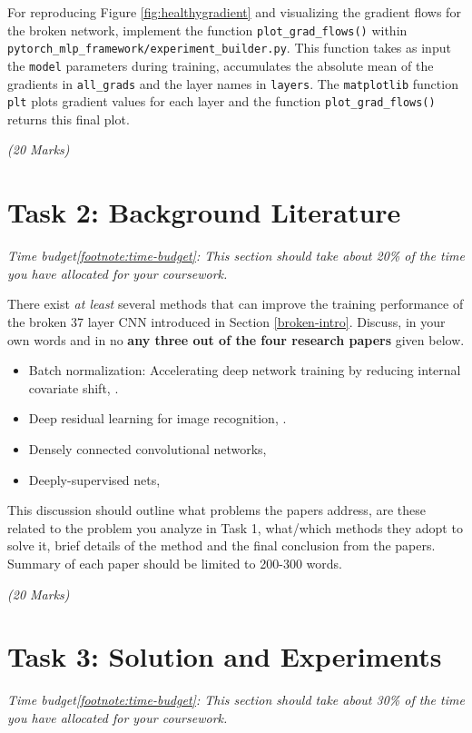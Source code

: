 \documentclass[11pt,]{article}
\begin{document}
For reproducing Figure \ref{fig:healthygradient} and visualizing the gradient flows for the broken network, implement the function \texttt{plot\_grad\_flows()} within \texttt{pytorch\_mlp\_framework/experiment\_builder.py}. This function takes as input the \texttt{model} parameters during training, accumulates the absolute mean of the gradients in \texttt{all\_grads} and the layer names in \texttt{layers}. The \texttt{matplotlib} function \texttt{plt} plots gradient values for each layer and the function \texttt{plot\_grad\_flows()} returns this final plot.

\emph{(20 Marks)}



\section{Task 2: Background Literature}
\label{sec.related}
\textit{Time budget{\cref{footnote:time-budget}}: This section should take about 20\% of the time you have allocated for your coursework.}\newline

There exist \emph{at least} several methods that can improve the training performance of the broken 37 layer CNN introduced in Section \ref{broken-intro}. Discuss, in your own words and in no \textbf{{any three out of the four research papers}} given below. 

\begin{itemize} 
    \item Batch normalization: Accelerating deep network training by reducing internal covariate shift, \cite{ioffe2015batch}.
    \item Deep residual learning for image recognition, \cite{he2016deep}.
    \item Densely connected convolutional networks, \cite{huang2017densely}
    \item Deeply-supervised nets, \cite{lee2015deeply}
\end{itemize}

This discussion should outline what problems the papers address, are these related to the problem you analyze in Task 1, what/which methods they adopt to solve it, brief details of the method and the final conclusion from the papers. Summary of each paper should be limited to 200-300 words. 

\emph{(20 Marks)}

\section{Task 3: Solution and Experiments}
\textit{Time budget{\cref{footnote:time-budget}}: This section should take about 30\% of the time you have allocated for your coursework.}\newline
\end{document}

